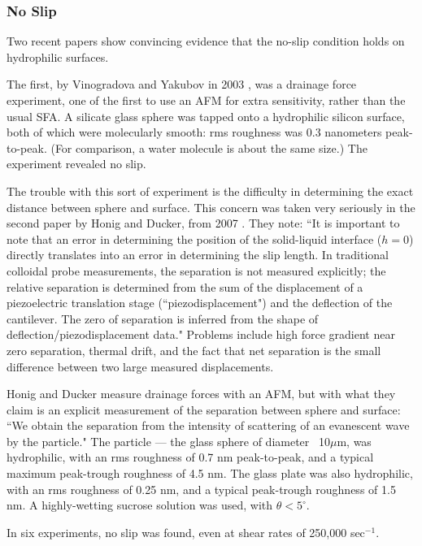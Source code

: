 \documentclass[12pt, a4paper, twoside, openright]{book}
\begin{document}
\subsubsection*{No Slip}

Two recent papers show convincing evidence that the no-slip condition holds on hydrophilic surfaces.

The first, by Vinogradova and Yakubov in 2003 \cite{VinogradovaYakubov2003}, was a drainage force experiment, one of the first to use an AFM for extra sensitivity, rather than the usual SFA. A silicate glass sphere was tapped onto a hydrophilic silicon surface, both of which were molecularly smooth: rms roughness was 0.3 nanometers peak-to-peak. (For comparison, a water molecule is about the same size.) The experiment revealed no slip.

The trouble with this sort of experiment is the difficulty in determining the exact distance between sphere and surface.  This concern was taken very seriously in the second paper by Honig and Ducker, from 2007 \cite{HonigDucker2007}. They note: ``It is important to note that an error in determining the position of the solid-liquid interface ($h=0$) directly translates into an error in determining the slip length. In traditional colloidal probe measurements, the separation is not measured explicitly; the relative separation is determined from the sum of the displacement of a piezoelectric translation stage (``piezodisplacement") and the deflection of the cantilever. The zero of separation is inferred from the shape of deflection/piezodisplacement data." Problems include high force gradient near zero separation, thermal drift, and the fact that net separation is the small difference between two large measured displacements.

Honig and Ducker measure drainage forces with an AFM, but with what they claim is an explicit measurement of the separation between sphere and surface: ``We obtain the separation from the intensity of scattering of an evanescent wave by the particle." The particle --- the glass sphere of diameter ~10$\mu$m, was hydrophilic, with an rms roughness of 0.7 nm peak-to-peak, and a typical maximum peak-trough roughness of 4.5 nm. The glass plate was also hydrophilic, with an rms roughness of 0.25 nm, and a typical peak-trough roughness of 1.5 nm. A highly-wetting sucrose solution was used, with $\theta<5^{\circ}$.

In six experiments, no slip was found, even at shear rates of 250,000 sec$^{-1}$. 
\end{document}

